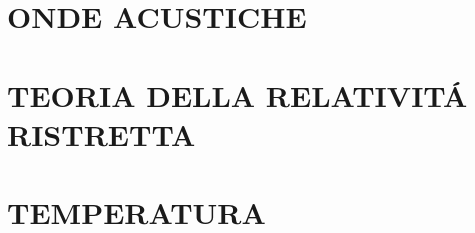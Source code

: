 \documentclass{article}
\begin{document}
	\section{ONDE ACUSTICHE}
		\begin{multicols}{2}
\begin{comment}
			\begin{equation}  \end{equation}
			\begin{equation}  \end{equation}
			\begin{equation}  \end{equation}
			\begin{equation}  \end{equation}
\end{comment}
		\end{multicols}
	\section{TEORIA DELLA RELATIVIT\'A RISTRETTA}
		\begin{multicols}{2}
\begin{comment}
			\begin{equation}  \end{equation}
			\begin{equation}  \end{equation}
			\begin{equation}  \end{equation}
			\begin{equation}  \end{equation}
\end{comment}
		\end{multicols}
	\section{TEMPERATURA}
		\begin{multicols}{2}
\begin{comment}
			\begin{equation}  \end{equation}
			\begin{equation}  \end{equation}
			\begin{equation}  \end{equation}
			\begin{equation}  \end{equation}
\end{comment}
		\end{multicols}
\end{document}
